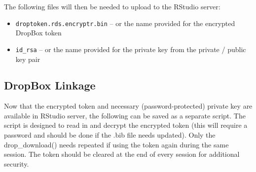 \documentclass[]{book}
\providecommand{\tightlist}{%
  \setlength{\itemsep}{0pt}\setlength{\parskip}{0pt}}
\begin{document}
The following files will then be needed to upload to the RStudio server:

\begin{itemize}
\tightlist
\item
  \texttt{droptoken.rds.encryptr.bin} -- or the name provided for the encrypted DropBox token
\item
  \texttt{id\_rsa} -- or the name provided for the private key from the private / public key pair
\end{itemize}

\hypertarget{dropbox-linkage}{%
\subsection{DropBox Linkage}\label{dropbox-linkage}}

Now that the encrypted token and necessary (password-protected) private key are available in RStudio server, the following can be saved as a separate script. The script is designed to read in and decrypt the encrypted token (this will require a password and should be done if the .bib file needs updated). Only the drop\_download() needs repeated if using the token again during the same session. The token should be cleared at the end of every session for additional security.
\end{document}
